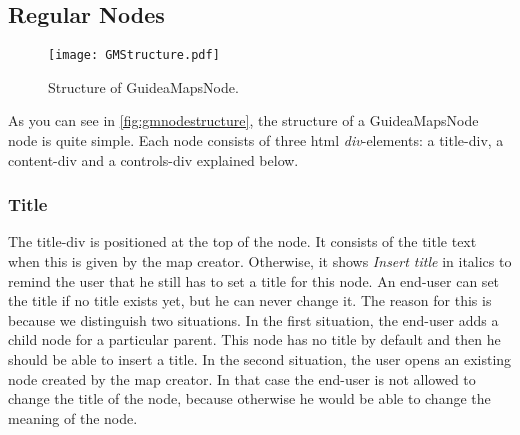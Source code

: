 \subsection{Regular Nodes}

\begin{figure}[H]
	\centering
	\texttt{[image: GMStructure.pdf]}
	\caption{Structure of GuideaMapsNode.}
	\label{fig:gmnodestructure}
\end{figure}

As you can see in \autoref{fig:gmnodestructure}, the structure of a GuideaMapsNode node is quite simple. Each node consists of three html \textit{div}-elements: a title-div, a content-div and a controls-div explained below.

\subsubsection{Title}
The title-div is positioned at the top of the node. It consists of the title text when this is given by the map creator. Otherwise, it shows \textit{Insert title} in italics to remind the user that he still has to set a title for this node. An end-user can set the title if no title exists yet, but he can never change it. The reason for this is because we distinguish two situations. In the first situation, the end-user adds a child node for a particular parent. This node has no title by default and then he should be able to insert a title. In the second situation, the user opens an existing node created by the map creator. In that case the end-user is not allowed to change the title of the node, because otherwise he would be able to change the meaning of the node. \\

